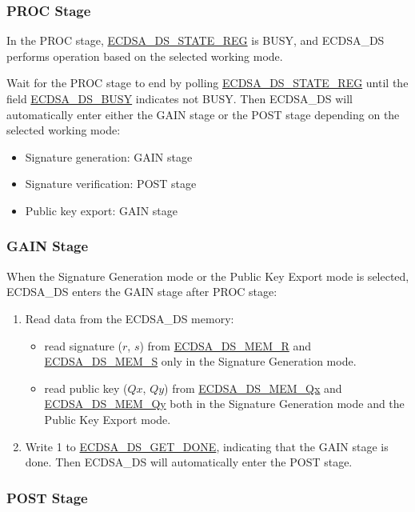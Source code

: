 \documentclass[main\_\_EN.tex]{subfiles}
\begin{document}
\subsubsection{PROC Stage}

In the PROC stage, \hyperref[regdesc:ECDSADSSTATEREG]{ECDSA\_DS\_STATE\_REG} is BUSY, and ECDSA\_DS performs operation based on the selected working mode.

Wait for the PROC stage to end by polling \hyperref[regdesc:ECDSADSSTATEREG]{ECDSA\_DS\_STATE\_REG} until the field \hyperref[fielddesc:ECDSADSBUSY]{ECDSA\_DS\_BUSY} indicates not BUSY. Then ECDSA\_DS will automatically enter either the GAIN stage or the POST stage depending on the selected working mode: 
\begin{itemize}
    \item Signature generation: GAIN stage
    \item Signature verification: POST stage
    \item Public key export: GAIN stage 
\end{itemize}

\subsubsection{GAIN Stage}

When the Signature Generation mode or the Public Key Export mode is selected, ECDSA\_DS enters the GAIN stage after PROC stage:

\begin{enumerate}
	\item Read data from the ECDSA\_DS memory:
	      \begin{itemize}
		      \item read signature ($r$, $s$) from \hyperref[tab:ecdsa-memory]{ECDSA\_DS\_MEM\_R} and \hyperref[tab:ecdsa-memory]{ECDSA\_DS\_MEM\_S} only in the Signature Generation mode.
		      \item read public key ($Qx$, $Qy$) from \hyperref[tab:ecdsa-memory]{ECDSA\_DS\_MEM\_Qx} and \hyperref[tab:ecdsa-memory]{ECDSA\_DS\_MEM\_Qy} both in the Signature Generation mode and the Public Key Export mode.
	      \end{itemize}
	\item Write 1 to \hyperref[fielddesc:ECDSADSGETDONE]{ECDSA\_DS\_GET\_DONE}, indicating that the GAIN stage is done. Then ECDSA\_DS will automatically enter the POST stage.
\end{enumerate}

\subsubsection{POST Stage}
\end{document}
